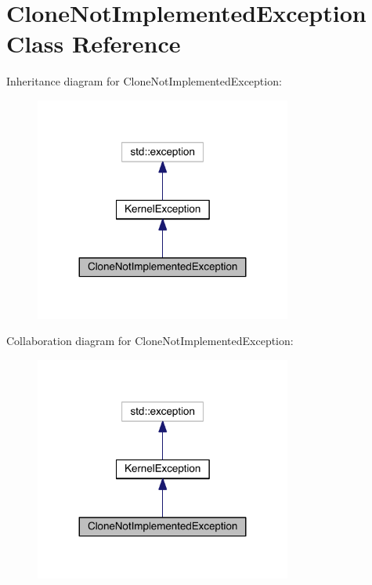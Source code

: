 \hypertarget{class_clone_not_implemented_exception}{}\section{Clone\+Not\+Implemented\+Exception Class Reference}
\label{class_clone_not_implemented_exception}


Inheritance diagram for Clone\+Not\+Implemented\+Exception\+:
\nopagebreak
\begin{figure}[H]
\begin{center}
\leavevmode
\includegraphics[width=239pt]{class_clone_not_implemented_exception__inherit__graph}
\end{center}
\end{figure}


Collaboration diagram for Clone\+Not\+Implemented\+Exception\+:
\nopagebreak
\begin{figure}[H]
\begin{center}
\leavevmode
\includegraphics[width=239pt]{class_clone_not_implemented_exception__coll__graph}
\end{center}
\end{figure}
